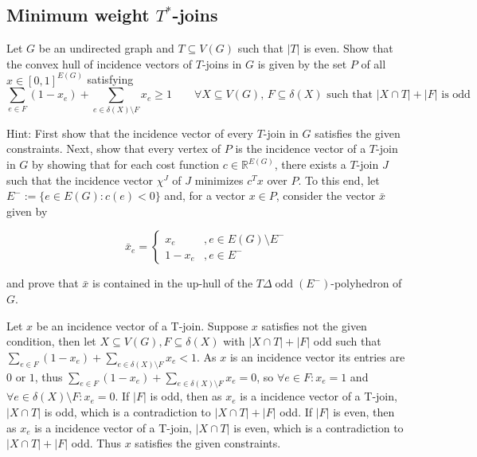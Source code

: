 \documentclass{article}
\newcommand{\R}{\mathbb{R}}
\begin{document}
  \subsection{Minimum weight $T^*$-joins}
  \begin{centerframebox}
    Let $G$ be an undirected graph and $T \subseteq V(G)$ such that $|T|$ is even.
    Show that the convex hull of incidence vectors of $T$-joins in $G$ is given by the set
    $P$ of all $x \in [0, 1]^{E(G)}$ satisfying
    \[ \sum_{e\in F}(1-x_{e}) + \sum_{e\in \delta(X) \setminus F} x_{e} \geq 1 \qquad
       \forall X\subseteq V(G),\, F\subseteq\delta(X)
       \textrm{ such that } |X\cap T|+|F| \textrm{ is odd }
    \]

    Hint: First show that the incidence vector of every $T$-join in $G$ satisfies the given
    constraints. Next, show that every vertex of $P$ is the incidence vector of a $T$-join
    in $G$ by showing that for each cost function $c \in \R^{E(G)}$, there exists a $T$-join $J$
    such that the incidence vector $\chi^J$ of $J$ minimizes $c^T x$ over $P$.
    To this end, let $E^{-} := \{e\in E(G):c(e)<0\}$ and, for a vector $x \in P$, consider the vector $\bar{x}$ given
    by

    \[
      \bar{x}_{e} =
      \begin{cases}
        x_{e} &, e \in E(G) \setminus E^{-} \\
        1-x_{e} &, e \in E^{-}
      \end{cases}
    \]

    and prove that $\bar{x}$ is contained in the up-hull of the $T \Delta \operatorname{odd}(E^-)$-polyhedron of $G$.
  \end{centerframebox}
  Let $x$ be an incidence vector of a T-join. Suppose $x$ satisfies not the given condition, then let $X\subseteq V(G), F\subseteq \delta(X)$ with $|X\cap T|+|F|$ odd such that $\sum_{e\in F}(1-x_{e}) + \sum_{e\in \delta(X) \setminus F} x_{e} < 1$. As $x$ is an incidence vector its entries  are $0$ or $1$, thus $\sum_{e\in F}(1-x_{e}) + \sum_{e\in \delta(X) \setminus F} x_{e} =0$, so $\forall e\in F: x_e=1$ and $ \forall e\in \delta(X) \setminus F: x_e=0$.
  If $|F|$ is odd, then as $x_e$ is a incidence vector of a T-join, $|X\cap T|$ is odd, which is a contradiction to $|X\cap T|+|F|$ odd. If $|F|$ is even, then as $x_e$ is a incidence vector of a T-join, $|X\cap T|$ is even, which is a contradiction to $|X\cap T|+|F|$ odd. Thus $x$  satisfies the given constraints.

\end{document}
